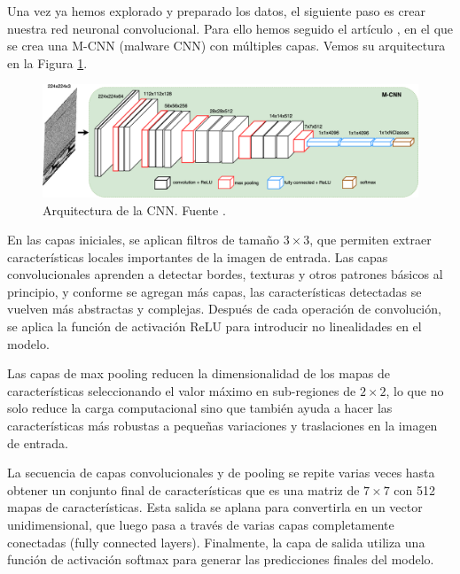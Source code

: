 Una vez ya hemos explorado y preparado los datos, el siguiente paso es crear nuestra red neuronal convolucional. Para ello hemos seguido el artículo \citep{kalash2018malware}, en el que se crea una M-CNN (malware CNN) con múltiples capas. Vemos su arquitectura en la Figura \ref{img: cnnMMC}.

\begin{figure}[h]
    \begin{center}
    \includegraphics[width=\textwidth]{img/cnnMMC.png}
    \end{center}
    \caption{Arquitectura de la CNN. Fuente \citep{kalash2018malware}.}
    \label{img: cnnMMC}
\end{figure}

En las capas iniciales, se aplican filtros de tamaño $3 \times 3$, que permiten extraer características locales importantes de la imagen de entrada. Las capas convolucionales aprenden a detectar bordes, texturas y otros patrones básicos al principio, y conforme se agregan más capas, las características detectadas se vuelven más abstractas y complejas\citep{geron2022hands}. Después de cada operación de convolución, se aplica la función de activación ReLU para introducir no linealidades en el modelo.

Las capas de max pooling reducen la dimensionalidad de los mapas de características seleccionando el valor máximo en sub-regiones de $2 \times 2$, lo que no solo reduce la carga computacional sino que también ayuda a hacer las características más robustas a pequeñas variaciones y traslaciones en la imagen de entrada\citep{geron2022hands}.

La secuencia de capas convolucionales y de pooling se repite varias veces hasta obtener un conjunto final de características que es una matriz de $7 \times 7$ con 512 mapas de características. Esta salida se aplana para convertirla en un vector unidimensional, que luego pasa a través de varias capas completamente conectadas (fully connected layers). Finalmente, la capa de salida utiliza una función de activación softmax para generar las predicciones finales del modelo.

